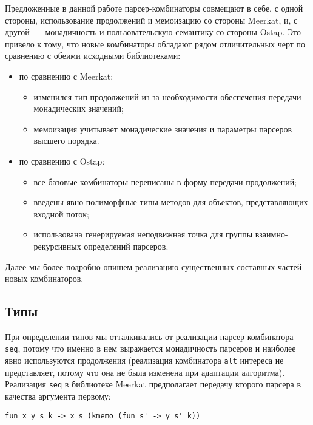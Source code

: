 \documentclass[conference]{IEEEtran}
\begin{document}
Предложенные в данной работе парсер-комбинаторы совмещают в себе, с одной стороны, использование продолжений и мемоизацию со стороны Meerkat, и, с другой~--- монадичность и пользовательскую семантику со стороны Ostap.
Это привело к тому, что новые комбинаторы обладают рядом отличительных черт по сравнению с обеими исходными библиотеками:

\begin{itemize}
\item по сравнению с Meerkat:

\begin{itemize}
\item изменился тип продолжений из-за необходимости обеспечения передачи монадических значений;
\item мемоизация учитывает монадические значения и параметры парсеров высшего порядка.
\end{itemize}

\item по сравнению с Ostap:

\begin{itemize}
\item все базовые комбинаторы переписаны в форму передачи продолжений;
\item введены явно-полиморфные типы методов для объектов, представляющих входной поток;
\item использована генерируемая неподвижная точка для группы взаимно-рекурсивных определений парсеров.
\end{itemize}
\end{itemize}

Далее мы более подробно опишем реализацию существенных составных частей новых комбинаторов.

\subsection{Типы}

При определении типов мы отталкивались от реализации парсер-комбинатора \lstinline|seq|, потому что именно в нем выражается монадичность парсеров и наиболее явно используются продолжения
(реализация комбинатора \lstinline|alt| интереса не представляет, потому что она не была изменена при адаптации алгоритма). Реализация \lstinline|seq| в библиотеке Meerkat
предполагает передачу второго парсера в качества аргумента первому:

\begin{lstlisting}[basicstyle=\small]
   fun x y s k -> x s (kmemo (fun s' -> y s' k))
\end{lstlisting}
\end{document}
